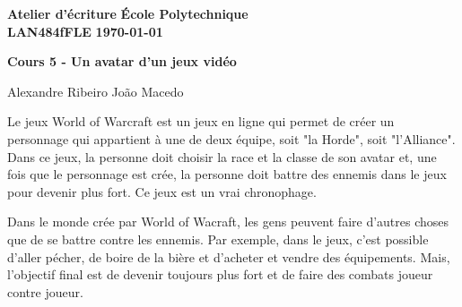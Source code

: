 \documentclass[10pt]{article} %
\newcommand{\createHeader}[5]{
	\noindent
	\normalsize\textbf{#2} \hfill \textbf{#1}\\
	\normalsize\textbf{#3} \hfill \textbf{\today}\vspace{20pt}
	\centerline{\Large \textbf{#5}}\vspace{1pt}
	\centerline{\small #4}\vspace{20pt}}
\begin{document}
	\createHeader{École Polytechnique}{Atelier d'écriture}{LAN484fFLE}{Alexandre Ribeiro João Macedo}{Cours 5 - Un avatar d'un jeux vidéo}

Le jeux World of Warcraft est un jeux en ligne qui permet de créer un personnage qui appartient à une de deux équipe, soit "la Horde", soit "l'Alliance". Dans ce jeux, la personne doit choisir la race et la classe de son avatar et, une fois que le personnage est crée, la personne doit battre des ennemis dans le jeux pour devenir plus fort. Ce jeux est un vrai chronophage.

Dans le monde crée par World of Wacraft, les gens peuvent faire d’autres choses que de se battre contre les ennemis. Par exemple, dans le jeux, c'est possible d'aller pécher, de boire de la bière et d'acheter et vendre des équipements. Mais, l'objectif final est de devenir toujours plus fort et de faire des combats joueur contre joueur.   
\end{document}
